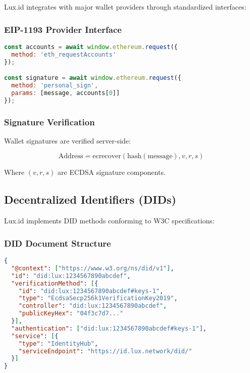 \documentclass[11pt,a4paper]{article}
\begin{document}
Lux.id integrates with major wallet providers through standardized interfaces:

\subsubsection{EIP-1193 Provider Interface}

\begin{lstlisting}[language=JavaScript]
const accounts = await window.ethereum.request({
  method: 'eth_requestAccounts'
});

const signature = await window.ethereum.request({
  method: 'personal_sign',
  params: [message, accounts[0]]
});
\end{lstlisting}

\subsubsection{Signature Verification}

Wallet signatures are verified server-side:

\begin{equation}
    \text{Address} = \text{ecrecover}(\text{hash}(\text{message}), v, r, s)
\end{equation}

Where $(v, r, s)$ are ECDSA signature components.

\subsection{Decentralized Identifiers (DIDs)}

Lux.id implements DID methods conforming to W3C specifications:

\subsubsection{DID Document Structure}

\begin{lstlisting}[language=json]
{
  "@context": ["https://www.w3.org/ns/did/v1"],
  "id": "did:lux:1234567890abcdef",
  "verificationMethod": [{
    "id": "did:lux:1234567890abcdef#keys-1",
    "type": "EcdsaSecp256k1VerificationKey2019",
    "controller": "did:lux:1234567890abcdef",
    "publicKeyHex": "04f3c7d7..."
  }],
  "authentication": ["did:lux:1234567890abcdef#keys-1"],
  "service": [{
    "type": "IdentityHub",
    "serviceEndpoint": "https://id.lux.network/did/"
  }]
}
\end{lstlisting}
\end{document}
